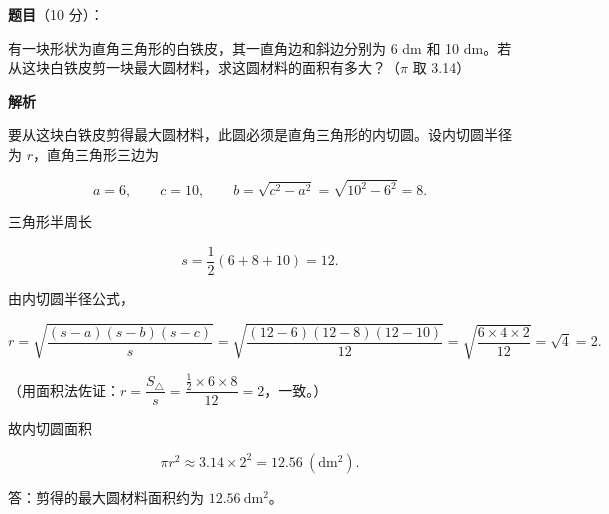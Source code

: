 \begin{answer}

\textbf{题目}（10 分）：

有一块形状为直角三角形的白铁皮，其一直角边和斜边分别为 6 dm 和 10 dm。若从这块白铁皮剪一块最大圆材料，求这圆材料的面积有多大？（$\pi$ 取 3.14）

\textbf{解析}

要从这块白铁皮剪得最大圆材料，此圆必须是直角三角形的内切圆。设内切圆半径为 $r$，直角三角形三边为

\nopagebreak[4]
\[
a=6,\qquad c=10,\qquad b=\sqrt{c^2-a^2}=\sqrt{10^2-6^2}=8.
\]

三角形半周长

\nopagebreak[4]
\[
s=\frac12(6+8+10)=12.
\]

由内切圆半径公式，

\nopagebreak[4]
\[
r=\sqrt{\frac{(s-a)(s-b)(s-c)}{s}}
=\sqrt{\frac{(12-6)(12-8)(12-10)}{12}}
=\sqrt{\frac{6\times4\times2}{12}}=\sqrt4=2.
\]

（用面积法佐证：$r=\dfrac{S_{\triangle}}{s}=\dfrac{\frac12\times6\times8}{12}=2$，一致。）

故内切圆面积

\nopagebreak[4]
\[
\pi r^2\approx3.14\times2^2=12.56\ (\mathrm{dm^2}).
\]

答：剪得的最大圆材料面积约为 $12.56\ \mathrm{dm^2}$。


\end{answer}
